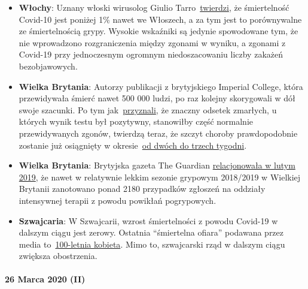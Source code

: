 \begin{itemize}
\tightlist
\item
  \textbf{Włochy}: Uznany włoski wirusolog Giulio
  Tarro~\href{https://www.cybermednews.eu/index.php/it/health/70871-interview-to-the-virologist-giulio-tarro-the-death-rate-of-covid-19-is-less-than-1-as-confirmed-by-the-national-institute-of-allergy-and-infectious-diseases}{twierdzi},
  że śmiertelność Covid-10 jest poniżej 1\% nawet we Włoszech, a za tym
  jest to porównywalne ze śmiertelnością grypy. Wysokie wskaźniki są
  jedynie spowodowane tym, że nie wprowadzono rozgraniczenia między
  zgonami w wyniku, a zgonami z Covid-19 przy jednoczesnym ogromnym
  niedoszacowaniu liczby zakażeń bezobjawowych.
\item
  \textbf{Wielka Brytania}: Autorzy publikacji z brytyjskiego Imperial
  College, która przewidywała śmierć nawet 500 000 ludzi, po raz kolejny
  skorygowali w dół swoje szacunki. Po tym
  jak~\href{https://www.bbc.com/news/health-51979654}{przyznali}, że
  znaczny odsetek zmarłych, u których wynik testu był pozytywny,
  stanowiłby część normalnie przewidywanych zgonów, twierdzą teraz, że
  szczyt choroby prawdopodobnie zostanie już osiągnięty w
  okresie~\href{https://www.thetimes.co.uk/article/nhs-now-likely-to-cope-with-coronavirus-says-key-scientist-rn5m6nggk}{od
  dwóch do trzech tygodni}.
\item
  \textbf{Wielka Brytania}: Brytyjska gazeta The Guardian
  \href{https://www.theguardian.com/society/2019/feb/20/britons-urged-to-get-flu-vaccine-as-critical-cases-rise-above-2000}{relacjonowała
  w lutym 2019}, że nawet w relatywnie lekkim sezonie grypowym 2018/2019
  w Wielkiej Brytanii zanotowano ponad 2180 przypadków zgłoszeń na
  oddziały intensywnej terapii z powodu powikłań pogrypowych.
\item
  \textbf{Szwajcaria}: W Szwajcarii, wzrost śmiertelności z powodu
  Covid-19 w dalszym ciągu jest zerowy. Ostatnia ``śmiertelna ofiara''
  podawana przez media
  to~\href{https://www.nau.ch/ort/basel/drei-weitere-covid-19-todesfalle-in-basel-stadt-65684099}{100-letnia
  kobieta}. Mimo to, szwajcarski rząd w dalszym ciągu zwiększa
  obostrzenia.
\end{itemize}

\hypertarget{26-marca-2020-ii}{%
\paragraph{26 Marca 2020 (II)}\label{26-marca-2020-ii}}

